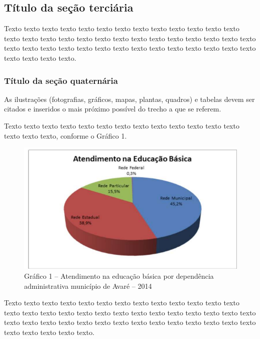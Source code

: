 \subsection{Título da seção terciária}

Texto texto texto texto texto texto texto texto texto texto texto texto texto texto 
texto texto texto texto texto texto texto texto texto texto texto texto texto texto texto 
texto texto texto texto texto texto texto texto texto texto texto texto texto texto texto 
texto. 

\subsubsection{Título da seção quaternária}

As ilustrações (fotografias, gráficos, mapas, plantas, quadros) e tabelas 
devem ser citados e inseridos o mais próximo possível do trecho a que se referem. 

Texto texto texto texto texto texto texto texto texto texto texto texto texto texto texto 
texto, conforme o Gráfico 1.

\begin{figure}[H]
\renewcommand{\figurename}{Gráfico}	
\caption*{ \label{graf1}Gráfico 1 – Atendimento na educação básica por dependência 
administrativa município de Avaré – 2014}
	\begin{center}
	    \includegraphics[scale=1.0]{imagens/grafs_1.png}
	\end{center}

\end{figure}



Texto texto texto texto texto texto texto texto texto texto texto texto texto texto 
texto texto texto texto texto texto texto texto texto texto texto texto texto texto texto 
texto texto texto texto texto texto texto texto texto texto texto texto texto texto texto 
texto texto. 




